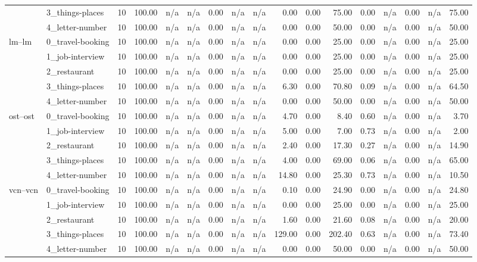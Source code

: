 \begin{tabular}{llrrrrrrrrrrrrrrr}
 & 3_things-places & 10 & 100.00 & n/a & n/a & 0.00 & n/a & n/a & 0.00 & 0.00 & 75.00 & 0.00 & n/a & 0.00 & n/a & 75.00 \\
 & 4_letter-number & 10 & 100.00 & n/a & n/a & 0.00 & n/a & n/a & 0.00 & 0.00 & 50.00 & 0.00 & n/a & 0.00 & n/a & 50.00 \\
\cline{1-17}
\multirow[t]{5}{*}{lm--lm} & 0_travel-booking & 10 & 100.00 & n/a & n/a & 0.00 & n/a & n/a & 0.00 & 0.00 & 25.00 & 0.00 & n/a & 0.00 & n/a & 25.00 \\
 & 1_job-interview & 10 & 100.00 & n/a & n/a & 0.00 & n/a & n/a & 0.00 & 0.00 & 25.00 & 0.00 & n/a & 0.00 & n/a & 25.00 \\
 & 2_restaurant & 10 & 100.00 & n/a & n/a & 0.00 & n/a & n/a & 0.00 & 0.00 & 25.00 & 0.00 & n/a & 0.00 & n/a & 25.00 \\
 & 3_things-places & 10 & 100.00 & n/a & n/a & 0.00 & n/a & n/a & 6.30 & 0.00 & 70.80 & 0.09 & n/a & 0.00 & n/a & 64.50 \\
 & 4_letter-number & 10 & 100.00 & n/a & n/a & 0.00 & n/a & n/a & 0.00 & 0.00 & 50.00 & 0.00 & n/a & 0.00 & n/a & 50.00 \\
\cline{1-17}
\multirow[t]{5}{*}{ost--ost} & 0_travel-booking & 10 & 100.00 & n/a & n/a & 0.00 & n/a & n/a & 4.70 & 0.00 & 8.40 & 0.60 & n/a & 0.00 & n/a & 3.70 \\
 & 1_job-interview & 10 & 100.00 & n/a & n/a & 0.00 & n/a & n/a & 5.00 & 0.00 & 7.00 & 0.73 & n/a & 0.00 & n/a & 2.00 \\
 & 2_restaurant & 10 & 100.00 & n/a & n/a & 0.00 & n/a & n/a & 2.40 & 0.00 & 17.30 & 0.27 & n/a & 0.00 & n/a & 14.90 \\
 & 3_things-places & 10 & 100.00 & n/a & n/a & 0.00 & n/a & n/a & 4.00 & 0.00 & 69.00 & 0.06 & n/a & 0.00 & n/a & 65.00 \\
 & 4_letter-number & 10 & 100.00 & n/a & n/a & 0.00 & n/a & n/a & 14.80 & 0.00 & 25.30 & 0.73 & n/a & 0.00 & n/a & 10.50 \\
\cline{1-17}
\multirow[t]{5}{*}{vcn--vcn} & 0_travel-booking & 10 & 100.00 & n/a & n/a & 0.00 & n/a & n/a & 0.10 & 0.00 & 24.90 & 0.00 & n/a & 0.00 & n/a & 24.80 \\
 & 1_job-interview & 10 & 100.00 & n/a & n/a & 0.00 & n/a & n/a & 0.00 & 0.00 & 25.00 & 0.00 & n/a & 0.00 & n/a & 25.00 \\
 & 2_restaurant & 10 & 100.00 & n/a & n/a & 0.00 & n/a & n/a & 1.60 & 0.00 & 21.60 & 0.08 & n/a & 0.00 & n/a & 20.00 \\
 & 3_things-places & 10 & 100.00 & n/a & n/a & 0.00 & n/a & n/a & 129.00 & 0.00 & 202.40 & 0.63 & n/a & 0.00 & n/a & 73.40 \\
 & 4_letter-number & 10 & 100.00 & n/a & n/a & 0.00 & n/a & n/a & 0.00 & 0.00 & 50.00 & 0.00 & n/a & 0.00 & n/a & 50.00 \\
\cline{1-17}
\bottomrule
\end{tabular}
